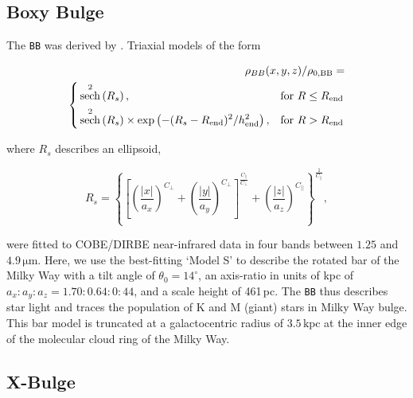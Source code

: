 \documentclass[doublespace,nopageskip]{VTthesis} %
\newcommand{\mrm}[1]{\mathrm{#1}}
\DeclareMathOperator\sech{sech}
\begin{document}
\begin{appendices}
	
	\subsection{Boxy Bulge}
	
	The \texttt{BB} was derived by \citet{Freudenreich1998_BoxyBulge_COBE}.
	Triaxial models of the form
	
	\begin{eqnarray}
		\rho_{BB}(x,y,z)/\rho_{0,\rm BB} = & \\\nonumber \left \{
		\begin{aligned}
			&\sech^2\left(R_s\right), && \text{for}\ R \leq R_{\rm end} \\
			&\sech^2\left(R_s\right) \times \exp\left(-(R_s-R_{\rm end})^2/h_{\rm end}^2\right), && \text{for}\ R > R_{\rm end} \\
		\end{aligned} \right. &
		\label{eq:BB_formula}
	\end{eqnarray} 
	
	\noindent where $R_s$ describes an ellipsoid,
	
	\begin{equation}
		R_s = \left\{ \left[ \left(\frac{|x|}{a_x}\right)^{C_{\bot}} + \left(\frac{|y|}{a_y}\right)^{C_{\bot}} \right]^{\frac{C_{||}}{C_{\bot}}} + \left(\frac{|z|}{a_z}\right)^{C_{||}} \right\}^{\frac{1}{C_{||}}}\mrm{,}
	\end{equation}
	
	\noindent were fitted to COBE/DIRBE near-infrared data in four bands between $1.25$ and $4.9\,\mrm{\mu m}$.
	Here, we use the best-fitting `Model S' to describe the rotated bar of the Milky Way with a tilt angle of $\theta_0 = 14^{\circ}$, an axis-ratio in units of kpc of $a_x : a_y : a_z = 1.70 : 0.64 : 0:44$, and a scale height of 461\,pc.
	The \texttt{BB} thus describes star light and traces the population of K and M (giant) stars in Milky Way bulge.
	This bar model is truncated at a galactocentric radius of $3.5\,\mrm{kpc}$ at the inner edge of the molecular cloud ring of the Milky Way. 
	
	
	\subsection{X-Bulge}
	

\end{appendices}
\end{document}
